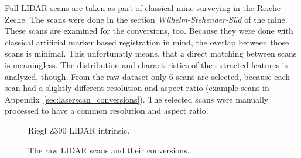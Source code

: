 Full \acrshort{LIDAR} scans are taken as part of classical mine surveying in the Reiche Zeche.
The scans were done in the section \emph{Wilhelm-Stehender-Süd} of the mine.
These scans are examined for the conversions, too.
Because they were done with classical artificial marker based registration in mind, the overlap between those scans is minimal.
This unfortunatly means, that a direct matching between scans is meaningless.
The distribution and characteristics of the extracted features is analyzed, though.
From the raw dataset only 6 scans are selected, because each scan had a slightly different resolution and aspect ratio (example scans in Appendix~\ref{sec:laserscan_conversions}).
The selected scans were manually processed to have a common resolution and aspect ratio.
\begin{figure}[H]
\CenterFloatBoxes%
\begin{floatrow}
    {\caption{Riegl Z300 \acrshort{LIDAR} intrinsic.}\label{tab:scan_intrinsic}}%
    {\caption{The raw \acrshort{LIDAR} scans and their conversions.}\label{fig:scans}}
\end{floatrow}
\end{figure}

